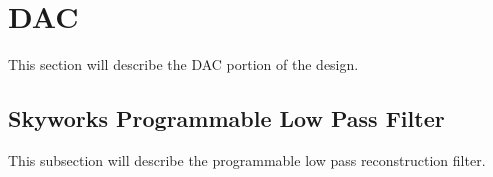 \section{DAC} %
\label{sec:dac}
    This section will describe the DAC portion of the design.
    
    \subsection{Skyworks Programmable Low Pass Filter} %
        \label{sec:sky73202}
        This subsection will describe the programmable low pass reconstruction filter.
